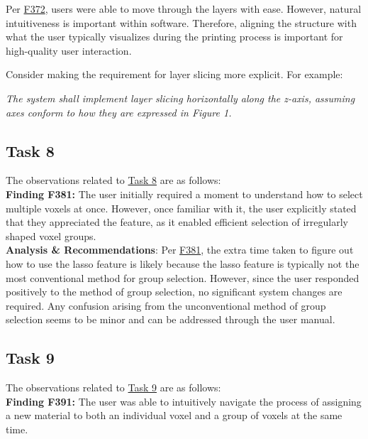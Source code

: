 \documentclass{article}
\begin{document}
\noindent Per \hyperlink{finding:F372}{F372}, users were able to move through the layers with ease. However, natural intuitiveness is important within software. Therefore, aligning the structure with what the user typically visualizes during the printing process is important for high-quality user interaction. 

\noindent Consider making the requirement for layer slicing more explicit. For example:

\begin{center}
    \textit{The system shall implement layer slicing horizontally along the z-axis, assuming axes conform to how they are expressed in Figure 1. }\\
\end{center}


\subsection{Task 8}

\noindent The observations related to \hyperlink{task:T8}{Task 8} are as follows:\\

\noindent \hypertarget{finding:F381}{\textbf{Finding F381:}} 
The user initially required a moment to understand how to select multiple voxels at once. However, once familiar with it, the user explicitly stated that they appreciated the feature, as it enabled efficient selection of irregularly shaped voxel groups.\\ 

\noindent \textbf{Analysis \& Recommendations}:
Per \hyperlink{finding:F381}{F381}, the extra time taken to figure out how to use the lasso feature is likely because the lasso feature is typically not the most conventional method for group selection. However, since the user responded positively to the method of group selection, no significant system changes are required. Any confusion arising from the unconventional method of group selection seems to be minor and can be addressed through the user manual. 

\subsection{Task 9}

\noindent The observations related to \hyperlink{task:T9}{Task 9} are as follows:\\

\noindent \hypertarget{finding:F391}{\textbf{Finding F391:}} 
The user was able to intuitively navigate the process of assigning a new material to both an individual voxel and a group of voxels at the same time.\\ 
\end{document}
